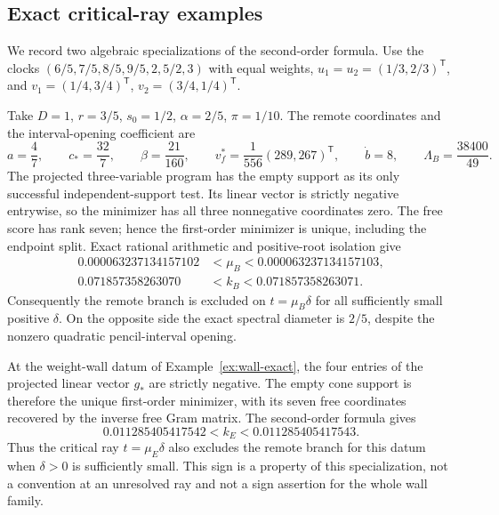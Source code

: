 \subsection{Exact critical-ray examples}\label{sec:critical-examples}
We record two algebraic specializations of the second-order formula.
Use the clocks $(6/5,7/5,8/5,9/5,2,5/2,3)$ with equal weights,
$u_1=u_2=(1/3,2/3)^{\mathsf T}$, and
$v_1=(1/4,3/4)^{\mathsf T}$, $v_2=(3/4,1/4)^{\mathsf T}$.

\begin{example}\label{ex:geometric-exact}
Take $D=1$, $r=3/5$, $s_0=1/2$, $\alpha=2/5$, $\pi=1/10$.
The remote coordinates and the interval-opening coefficient are
\[
 a=\frac47,\qquad c_* =\frac{32}7,\qquad
 \beta=\frac{21}{160},\qquad
 v_f^*=\frac1{556}(289,267)^{\mathsf T},\qquad
 \dot b=8,\qquad \Lambda_B=\frac{38400}{49}.
\]
The projected three-variable program has the empty support as its only
successful independent-support test. Its linear vector is strictly
negative entrywise, so the minimizer has all three nonnegative
coordinates zero. The free score has rank seven; hence the first-order
minimizer is unique, including the endpoint split. Exact rational
arithmetic and positive-root isolation give
\begin{align*}
 0.000063237134157102&<\mu_B<0.000063237134157103,\\
 0.071857358263070&<k_B<0.071857358263071.
\end{align*}
Consequently the remote branch is excluded on $t=\mu_B\delta$ for
all sufficiently small positive $\delta$. On the opposite side the
exact spectral diameter is $2/5$, despite the nonzero quadratic
pencil-interval opening.
\end{example}

\begin{example}\label{ex:weight-critical}
At the weight-wall datum of Example~\ref{ex:wall-exact}, the four entries
of the projected linear vector $g_*$ are strictly negative. The empty
cone support is therefore the unique first-order minimizer, with its
seven free coordinates recovered by the inverse free Gram matrix.
The second-order formula gives
\[
 0.011285405417542<k_E<0.011285405417543.
\]
Thus the critical ray $t=\mu_E\delta$ also excludes the remote branch
for this datum when $\delta>0$ is sufficiently small. This sign is a
property of this specialization, not a convention at an unresolved ray
and not a sign assertion for the whole wall family.
\end{example}


